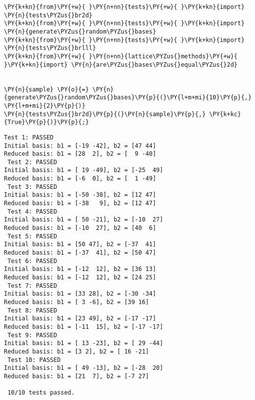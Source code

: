 \documentclass[a4paper,12pt]{article}
\begin{document}
    \begin{tcolorbox}[breakable, size=fbox, boxrule=1pt, pad at break*=1mm,colback=cellbackground, colframe=cellborder]
\begin{Verbatim}[commandchars=\\\{\}]
\PY{k+kn}{from}\PY{+w}{ }\PY{n+nn}{tests}\PY{+w}{ }\PY{k+kn}{import} \PY{n}{tests\PYZus{}br2d}
\PY{k+kn}{from}\PY{+w}{ }\PY{n+nn}{tests}\PY{+w}{ }\PY{k+kn}{import} \PY{n}{generate\PYZus{}random\PYZus{}bases}
\PY{k+kn}{from}\PY{+w}{ }\PY{n+nn}{tests}\PY{+w}{ }\PY{k+kn}{import} \PY{n}{tests\PYZus{}brlll}
\PY{k+kn}{from}\PY{+w}{ }\PY{n+nn}{lattice\PYZus{}methods}\PY{+w}{ }\PY{k+kn}{import} \PY{n}{are\PYZus{}bases\PYZus{}equal\PYZus{}2d}


\PY{n}{sample} \PY{o}{=} \PY{n}{generate\PYZus{}random\PYZus{}bases}\PY{p}{(}\PY{l+m+mi}{10}\PY{p}{,} \PY{l+m+mi}{2}\PY{p}{)}
\PY{n}{tests\PYZus{}br2d}\PY{p}{(}\PY{n}{sample}\PY{p}{,} \PY{k+kc}{True}\PY{p}{)}\PY{p}{;}
\end{Verbatim}
\end{tcolorbox}

    \begin{Verbatim}[commandchars=\\\{\}]
 Test 1: PASSED
Initial basis: b1 = [-19 -42], b2 = [47 44]
Reduced basis: b1 = [28  2], b2 = [  9 -40]
 Test 2: PASSED
Initial basis: b1 = [ 19 -49], b2 = [-25  49]
Reduced basis: b1 = [-6  0], b2 = [  1 -49]
 Test 3: PASSED
Initial basis: b1 = [-50 -38], b2 = [12 47]
Reduced basis: b1 = [-38   9], b2 = [12 47]
 Test 4: PASSED
Initial basis: b1 = [ 50 -21], b2 = [-10  27]
Reduced basis: b1 = [-10  27], b2 = [40  6]
 Test 5: PASSED
Initial basis: b1 = [50 47], b2 = [-37  41]
Reduced basis: b1 = [-37  41], b2 = [50 47]
 Test 6: PASSED
Initial basis: b1 = [-12  12], b2 = [36 13]
Reduced basis: b1 = [-12  12], b2 = [24 25]
 Test 7: PASSED
Initial basis: b1 = [33 28], b2 = [-30 -34]
Reduced basis: b1 = [ 3 -6], b2 = [39 16]
 Test 8: PASSED
Initial basis: b1 = [23 49], b2 = [-17 -17]
Reduced basis: b1 = [-11  15], b2 = [-17 -17]
 Test 9: PASSED
Initial basis: b1 = [ 13 -23], b2 = [ 29 -44]
Reduced basis: b1 = [3 2], b2 = [ 16 -21]
 Test 10: PASSED
Initial basis: b1 = [ 49 -13], b2 = [-28  20]
Reduced basis: b1 = [21  7], b2 = [-7 27]

 10/10 tests passed.
    \end{Verbatim}



\end{document}
